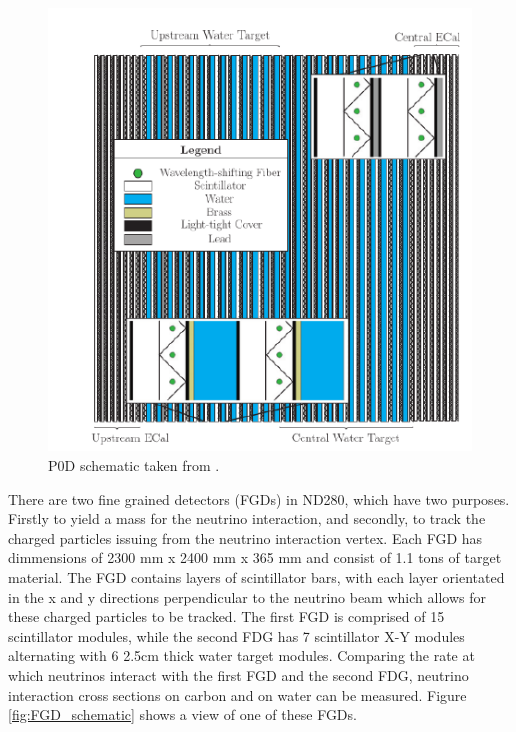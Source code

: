 \begin{figure}
    \includegraphics[width=\textwidth]{Figures/p0d.png}
    \caption{P0D schematic taken from \cite{t2k_collaboration_t2k_2011}.}
\label{fig:p0d}
\end{figure}

There are two fine grained detectors (FGDs) in ND280, which have two purposes. Firstly to yield a mass for the neutrino interaction, and secondly, to track the charged particles issuing from the neutrino interaction vertex. Each FGD has dimmensions of 2300 mm x 2400 mm x 365 mm and consist of 1.1 tons of target material. The FGD  contains layers of scintillator bars, with each layer orientated in the x and y directions perpendicular to the neutrino beam which allows for these charged particles to be tracked. The first FGD is comprised of 15 scintillator modules, while the second FDG has 7 scintillator X-Y modules alternating with 6 2.5cm thick water target modules. Comparing the rate at which neutrinos interact with the first FGD and the second FDG, neutrino interaction cross sections on carbon and on water can be measured. Figure \ref{fig:FGD_schematic} shows a view of one of these FGDs.

